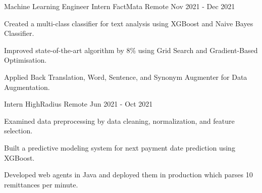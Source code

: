 \begin{cventries}

  \cventry
    {Machine Learning Engineer Intern} %
    {FactMata} %
    {Remote} %
    {Nov 2021 - Dec 2021} %
    {
      \begin{cvitems} %
        \item {Created a multi-class classifier for text analysis using XGBoost and Naive Bayes Classifier.}
	\item {Improved state-of-the-art algorithm by 8\% using Grid Search and Gradient-Based Optimisation.}
        \item {Applied Back Translation, Word, Sentence, and Synonym Augmenter for Data Augmentation.}
      \end{cvitems}
    }


  \cventry
    {Intern} %
    {HighRadius} %
    {Remote} %
    {Jun 2021 - Oct 2021} %
    {
      \begin{cvitems} %
        \item {Examined data preprocessing by data cleaning, normalization, and feature selection.}
        \item {Built a predictive modeling system for next payment date prediction using XGBoost.}
        \item {Developed web agents in Java and deployed them in production which parses 10 remittances per minute.}
      \end{cvitems}
    }


\end{cventries}
